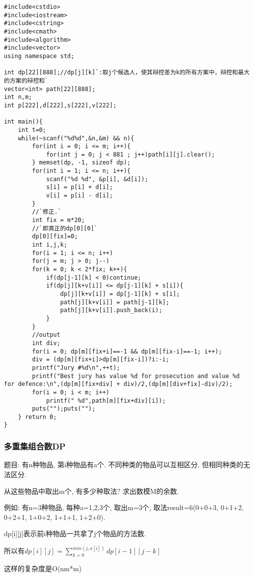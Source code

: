\begin{lstlisting}
#include<cstdio>
#include<iostream>
#include<cstring>
#include<cmath>
#include<algorithm>
#include<vector>
using namespace std;

int dp[22][888];//dp[j][k]`:取j个候选人，使其辩控差为k的所有方案中，辩控和最大的方案的辩控和`
vector<int> path[22][888];
int n,m;
int p[222],d[222],s[222],v[222];

int main(){
    int t=0;
    while(~scanf("%d%d",&n,&m) && n){
        for(int i = 0; i <= m; i++){
            for(int j = 0; j < 881 ; j++)path[i][j].clear();
        } memset(dp, -1, sizeof dp);
        for(int i = 1; i <= n; i++){
            scanf("%d %d", &p[i], &d[i]);
            s[i] = p[i] + d[i];
            v[i] = p[i] - d[i];
        }
        //`修正.`
        int fix = m*20;
        //`即真正的dp[0][0]`
        dp[0][fix]=0;
        int i,j,k;
        for(i = 1; i <= n; i++)
        for(j = m; j > 0; j--)
        for(k = 0; k < 2*fix; k++){
            if(dp[j-1][k] < 0)continue;
            if(dp[j][k+v[i]] <= dp[j-1][k] + s[i]){
                dp[j][k+v[i]] = dp[j-1][k] + s[i];
                path[j][k+v[i]] = path[j-1][k];
                path[j][k+v[i]].push_back(i);
            }
        }
        //output
        int div;
        for(i = 0; dp[m][fix+i]==-1 && dp[m][fix-i]==-1; i++);
        div = (dp[m][fix+i]>dp[m][fix-i])?i:-i;
        printf("Jury #%d\n",++t);
        printf("Best jury has value %d for prosecution and value %d for defence:\n",(dp[m][fix+div] + div)/2,(dp[m][div+fix]-div)/2);
        for(i = 0; i < m; i++)
            printf(" %d",path[m][fix+div][i]);
        puts("");puts("");
    } return 0;
}
\end{lstlisting}

\subsubsection{多重集组合数DP}

题目: 有n种物品, 第i种物品有a个. 不同种类的物品可以互相区分, 但相同种类的无法区分.

从这些物品中取出m个, 有多少种取法? 求出数模M的余数.

例如: 有n=3种物品, 每种a={1,2,3}个, 取出m=3个, 取法result=6(0+0+3, 0+1+2, 0+2+1, 1+0+2, 1+1+1, 1+2+0).

dp[i][j]表示前i种物品一共拿了j个物品的方法数.

所以有$dp[i][j]= \sum_{k=0}^{min(j,x[i])}  dp[i-1][j-k]$

这样的复杂度是O(nm*m)

